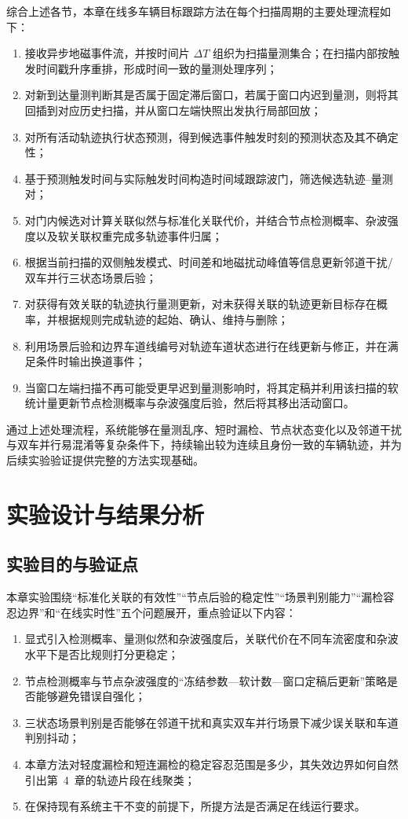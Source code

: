 \documentclass{xdupgthesis}
\begin{document}
综合上述各节，本章在线多车辆目标跟踪方法在每个扫描周期的主要处理流程如下：
\begin{enumerate}
	\item 接收异步地磁事件流，并按时间片 $\Delta T$ 组织为扫描量测集合；在扫描内部按触发时间戳升序重排，形成时间一致的量测处理序列；
	\item 对新到达量测判断其是否属于固定滞后窗口，若属于窗口内迟到量测，则将其回插到对应历史扫描，并从窗口左端快照出发执行局部回放；
	\item 对所有活动轨迹执行状态预测，得到候选事件触发时刻的预测状态及其不确定性；
	\item 基于预测触发时间与实际触发时间构造时间域跟踪波门，筛选候选轨迹--量测对；
	\item 对门内候选对计算关联似然与标准化关联代价，并结合节点检测概率、杂波强度以及软关联权重完成多轨迹事件归属；
	\item 根据当前扫描的双侧触发模式、时间差和地磁扰动峰值等信息更新邻道干扰/双车并行三状态场景后验；
	\item 对获得有效关联的轨迹执行量测更新，对未获得关联的轨迹更新目标存在概率，并根据规则完成轨迹的起始、确认、维持与删除；
	\item 利用场景后验和边界车道线编号对轨迹车道状态进行在线更新与修正，并在满足条件时输出换道事件；
	\item 当窗口左端扫描不再可能受更早迟到量测影响时，将其定稿并利用该扫描的软统计量更新节点检测概率与杂波强度后验，然后将其移出活动窗口。
\end{enumerate}

通过上述处理流程，系统能够在量测乱序、短时漏检、节点状态变化以及邻道干扰与双车并行易混淆等复杂条件下，持续输出较为连续且身份一致的车辆轨迹，并为后续实验验证提供完整的方法实现基础。

\section{实验设计与结果分析}
\label{sec:ch3_experiment}

\subsection{实验目的与验证点}

本章实验围绕“标准化关联的有效性”“节点后验的稳定性”“场景判别能力”“漏检容忍边界”和“在线实时性”五个问题展开，重点验证以下内容：
\begin{enumerate}
	\item 显式引入检测概率、量测似然和杂波强度后，关联代价在不同车流密度和杂波水平下是否比规则打分更稳定；
	\item 节点检测概率与节点杂波强度的“冻结参数—软计数—窗口定稿后更新”策略是否能够避免错误自强化；
	\item 三状态场景判别是否能够在邻道干扰和真实双车并行场景下减少误关联和车道判别抖动；
	\item 本章方法对轻度漏检和短连漏检的稳定容忍范围是多少，其失效边界如何自然引出第~4~章的轨迹片段在线聚类；
	\item 在保持现有系统主干不变的前提下，所提方法是否满足在线运行要求。
\end{enumerate}
\end{document}
